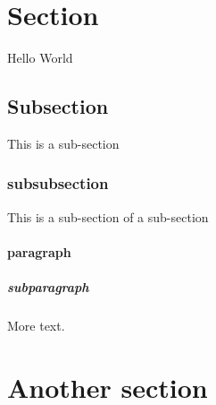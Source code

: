 \documentclass{article}
\begin{document}
\section{Section}
Hello World
\subsection{Subsection}
This is a sub-section
\subsubsection{subsubsection}
This is a sub-section of a sub-section
\paragraph{paragraph}
\subparagraph{subparagraph}
More text.
\section{Another section}
\end{document}
